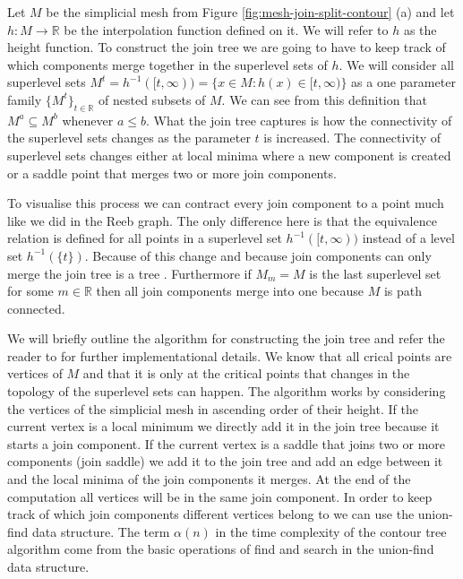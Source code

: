 Let $M$ be the simplicial mesh from Figure \ref{fig:mesh-join-split-contour} (a) and let $h : M \to \mathbb{R}$ be the interpolation function defined on it. We will refer to $h$ as the height function. To construct the join tree we are going to have to keep track of which components merge together in the superlevel sets of $h$. We will consider all superlevel sets $M^t = h^{-1}([t, \infty)) = \{x \in M : h(x) \in [t, \infty) \}$ as a one parameter family $\{M^t\}_{t \in \mathbb{R}}$
of nested subsets of $M$. We can see from this definition that $M^a \subseteq M^b$ whenever $a \le b$. What the join tree captures is how the connectivity of the superlevel sets changes as the parameter $t$ is increased. The connectivity of superlevel sets changes either at local minima where a new component is created or a saddle point that merges two or more join components.


To visualise this process we can contract every join component to a point much like we did in the Reeb graph. The only difference here is that the equivalence relation is defined for all points in a superlevel set $h^{-1}([t, \infty))$ instead of a level set $h^{-1}(\{t\})$. Because of this change and because join components can only merge the join tree is a tree \cite{comp-topo}. Furthermore if $M_m = M$ is the last superlevel set for some $m \in \mathbb{R}$ then all join components merge into one because $M$ is path connected.

We will briefly outline the algorithm for constructing the join tree and refer the reader to \cite{ct-big-paper} for further implementational details. We know that all crical points are vertices of $M$ and that it is only at the critical points that changes in the topology of the superlevel sets can happen. The algorithm works by considering the vertices of the simplicial mesh in ascending order of their height. If the current vertex is a local minimum we directly add it in the join tree because it starts a join component. If the current vertex is a saddle that joins two or more components (join saddle) we add it to the join tree and add an edge between it and the local minima of the join components it merges. At the end of the computation all vertices will be in the same join component. In order to keep track of which join components different vertices belong to we can use the union-find data structure. The term  $\alpha(n)$ in the time complexity of the contour tree algorithm come from the basic operations of find and search in the union-find data structure.

